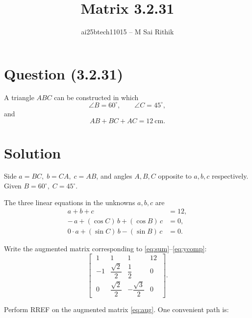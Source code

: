 \documentclass[12pt]{article}
\title{Matrix 3.2.31}
\author{ai25btech11015 -- M Sai Rithik}
\date{}
\begin{document}
\maketitle

\section*{Question (3.2.31)}
A triangle \(ABC\) can be constructed in which\[
\angle B = 60^\circ,\qquad \angle C = 45^\circ,
\] and
\[
AB + BC + AC = 12\ \text{cm}.
\]



\section*{Solution}

Side \(a=BC,\; b=CA,\; c=AB\), and angles \(A,B,C\) opposite to \(a,b,c\) respectively.
Given \(B=60^\circ,\; C=45^\circ\).

The three linear equations in the unknowns \(a,b,c\) are
\begin{align}
a + b + c &= 12, \label{eq:sum}\\
-\,a + (\cos C)\,b + (\cos B)\,c &= 0, \label{eq:xcomp}\\
0\cdot a + (\sin C)\,b - (\sin B)\,c &= 0. \label{eq:ycomp}
\end{align}

Write the augmented matrix corresponding to \eqref{eq:sum}--\eqref{eq:ycomp}:
\begin{equation}
\left[\;
\begin{array}{ccc|c}
1 & 1 & 1 & 12 \\[4pt]
-1 & \dfrac{\sqrt{2}}{2} & \dfrac{1}{2} & 0 \\[6pt]
0 & \dfrac{\sqrt{2}}{2} & -\dfrac{\sqrt{3}}{2} & 0
\end{array}
\;\right].
\label{eq:aug}
\end{equation}

Perform RREF on the augmented matrix \eqref{eq:aug}. One convenient path is:
\end{document}
